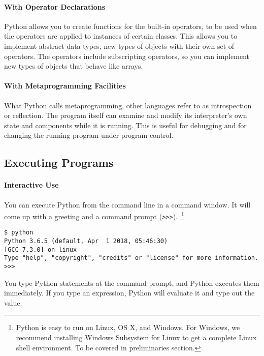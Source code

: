 \paragraph{With Operator Declarations}
Python allows you to create
functions for the built-in operators, to be used when the operators are
applied to instances of certain classes. This allows you to implement
abstract data types, new types of objects with their own set of
operators. The operators include subscripting operators, so you can
implement new types of objects that behave like arrays.

\paragraph{With Metaprogramming Facilities}
What Python calls metaprogramming,
other languages refer to as introspection or reflection. The program
itself can examine and modify its interpreter's own state and components
while it is running. This is useful for debugging and for changing the
running program under program control.

\subsection{Executing Programs}
\label{executing-programs}

\paragraph{Interactive Use}
\label{interactive-use}
You can execute Python from the
command line in a command window. It will come up with a greeting and a
command prompt (\verb">>>").~\footnote{Python is easy to run on Linux, OS X, and Windows. For Windows, we recommend installing Windows Subsystem for Linux to get a complete Linux shell environment. To be covered in preliminaries section.}

\begin{verbatim}
$ python
Python 3.6.5 (default, Apr  1 2018, 05:46:30) 
[GCC 7.3.0] on linux
Type "help", "copyright", "credits" or "license" for more information.
>>> 
\end{verbatim}

You type Python statements at the
command prompt, and Python executes them immediately. If you type an
expression, Python will evaluate it and type out the value.

